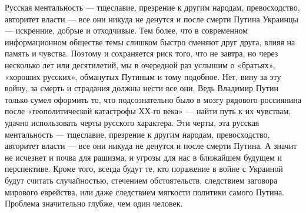  
 
 
 
 

Русская ментальность — тщеславие, презрение к другим народам, превосходство, авторитет власти — все они никуда не денутся и после смерти Путина
Украинцы — искренние, добрые и отходчивые. Тем более, что в современном информационном обществе темы слишком быстро сменяют друг друга, влияя на память и чувства.
Поэтому и сохраняется риск того, что не завтра, но через несколько лет или десятилетий, мы в очередной раз услышим о «братьях», «хороших русских», обманутых Путиным и тому подобное.
Нет, вину за эту войну, за смерть и страдания должны нести все они.
Ведь Владимир Путин только сумел оформить то, что подсознательно было в мозгу рядового россиянина после «геополитической катастрофы ХХ-го века» — найти путь к их чувствам, удачно использовать черты русского характера.
Эти черты, эта русская ментальность — тщеславие, презрение к другим народам, превосходство, авторитет власти — все они никуда не денутся и после смерти Путина.
А значит не исчезнет и почва для рашизма, и угрозы для нас в ближайшем будущем и перспективе.
Кроме того, всегда будут те, кто поражение в войне с Украиной будут считать случайностью, стечением обстоятельств, следствием заговора мирового еврейства, или даже следствием мягкости политики самого Путина.
Проблема значительно глубже, чем один человек.
